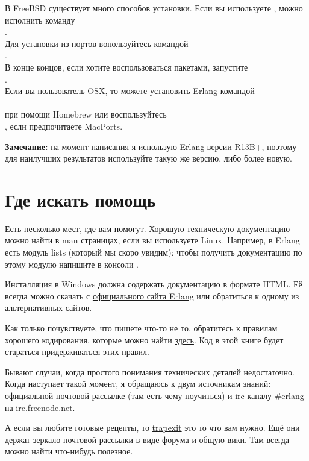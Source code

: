 В FreeBSD существует много способов установки. Если вы используете , можно исполнить команду\\ 
.\\ 
Для установки из портов вопользуйтесь командой\\ 
.\\ 
В конце концов, если хотите воспользоваться пакетами, запустите\\  
.\\ 
Если вы пользователь OSX, то можете установить Erlang командой\\ 
\\ 
при помощи Homebrew или воспользуйтесь\\ 
, если предпочитаете MacPorts.\\ 
\colorbox{lgray}
{
\begin{minipage}{1.0\linewidth}
\textbf{Замечание:} на момент написания я использую Erlang версии R13B+, поэтому для наилучших результатов используйте такую же версию, либо более новую.
\end{minipage}
}
\section{Где искать помощь}
Есть несколько мест, где вам помогут. Хорошую техническую документацию можно найти в man страницах, если вы используете Linux. Например, в Erlang есть модуль lists (который мы скоро увидим): чтобы получить документацию по этому модулю напишите в консоли .

Инсталляция в Windows должна содержать документацию в формате HTML. Её всегда можно скачать с \href{http://erlang.org/doc/}{официального сайта Erlang} или обратиться к одному из \href{http://erldocs.com}{альтернативных сайтов}.

Как только почувствуете, что пишете что\--то не то, обратитесь к правилам хорошего кодирования, которые можно найти \href{http://www.erlang.se/doc/programming_rules.shtml}{здесь}. Код в этой книге будет стараться придерживаться этих правил.

Бывают случаи, когда простого понимания технических деталей недостаточно. Когда наступает такой момент, я обращаюсь к двум источникам знаний: официальной \href{http://www.erlang.org/static/doc/mailinglist.html}{почтовой рассылке} (там есть чему поучиться) и irc каналу \#erlang на irc.freenode.net.

А если вы любите готовые рецепты, то \href{http://trapexit.org}{trapexit} это то что вам нужно. Ещё они держат зеркало почтовой рассылки в виде форума и общую вики. Там всегда можно найти что\--нибудь полезное.
